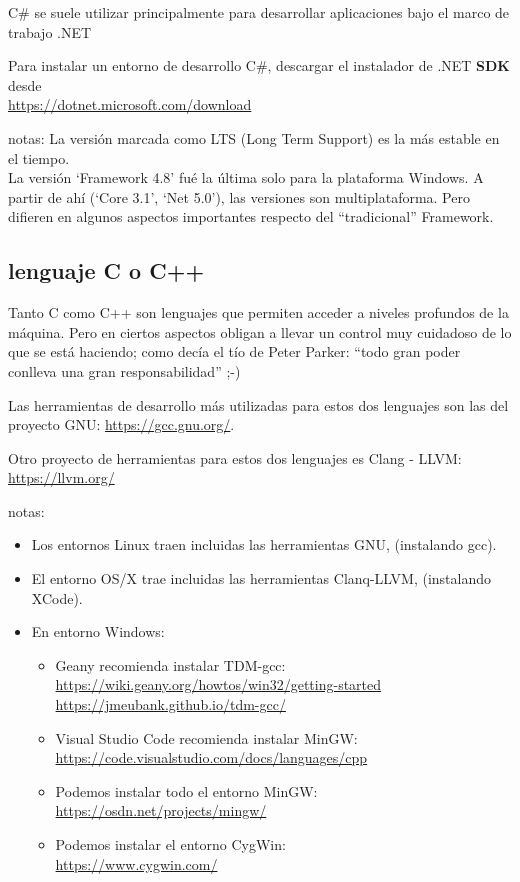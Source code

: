 \documentclass[spanish,12pt,a4paper,final,oneside]{book}
\begin{document}
C\# se suele utilizar principalmente para desarrollar aplicaciones bajo el marco de trabajo .NET

Para instalar un entorno de desarrollo C\#, descargar el instalador de .NET  \textbf{SDK} desde
\\ \url{https://dotnet.microsoft.com/download}

notas:
La versión marcada como LTS (Long Term Support) es la más estable en el tiempo.
\\La versión `Framework 4.8' fué la última solo para la plataforma Windows. A partir de ahí (`Core 3.1', `Net 5.0'), las versiones son multiplataforma. Pero difieren en algunos aspectos importantes respecto del ``tradicional'' Framework. 


\subsection{lenguaje C o C++}

Tanto C como C++ son lenguajes que permiten acceder a niveles profundos de la máquina. Pero en ciertos aspectos obligan a llevar un control muy cuidadoso de lo que se está haciendo; como decía el tío de Peter Parker: ``todo gran poder conlleva una gran responsabilidad'' ;-)

Las herramientas de desarrollo más utilizadas para estos dos lenguajes son las del proyecto GNU: \url{https://gcc.gnu.org/}. 

Otro proyecto de herramientas para estos dos lenguajes es Clang - LLVM: \url{https://llvm.org/}

\vspace{0.5cm}
notas:
\begin{itemize}
\item Los entornos Linux traen incluidas las herramientas GNU, (instalando gcc).
\item El entorno OS/X trae incluidas las herramientas Clanq-LLVM, (instalando XCode).
\item En entorno Windows:
\begin{itemize}
\item Geany recomienda instalar TDM-gcc:
\\ \url{https://wiki.geany.org/howtos/win32/getting-started}
\\ \url{https://jmeubank.github.io/tdm-gcc/}
\item Visual Studio Code recomienda instalar MinGW:
\\ \url{https://code.visualstudio.com/docs/languages/cpp}
\item Podemos instalar todo el entorno MinGW:
\\ \url{https://osdn.net/projects/mingw/}
\item Podemos instalar el entorno CygWin:
\\ \url{https://www.cygwin.com/}
\end{itemize}
\end{itemize}
\end{document}
